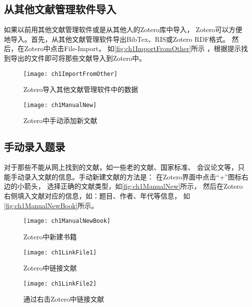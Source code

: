 \documentclass[cn,11pt,chinese]{elegantbook}
\begin{document}
	\subsection{从其他文献管理软件导入}\label{OtherRefSoft}
	如果以前用其他文献管理软件或是从其他人的Zotero库中导入，
	Zotero可以方便地导入。首先，从其他文献管理软件导出BibTex、RIS或Zotero RDF格式。
	然后，在Zotero中点击File-Import，
	如\autoref{fig:ch1ImportFromOther}所示
	，根据提示找到导出的文件即可将那些文献导入到Zotero中。
	\begin{figure}
		\centering
		\begin{minipage}[t]{\dimexpr0.5\textwidth-4em}
			\centering
			\texttt{[image: ch1ImportFromOther]}
			\caption{Zotero导入其他文献管理软件中的数据}
			\label{fig:ch1ImportFromOther}
		\end{minipage}	
		\hspace{1cm}
		\begin{minipage}[t]{\dimexpr0.5\textwidth-4em}
			\centering
			\texttt{[image: ch1ManualNew]}
			\caption{Zotero中手动添加新文献}
			\label{fig:ch1ManualNew}
		\end{minipage}	
	\end{figure}

	\subsection{手动录入题录}\label{sec:ManualImport}
	对于那些不能从网上找到的文献，如一些老的文献、国家标准、
	会议论文等，只能手动录入文献的信息。手动新建文献的方法是：
	在Zotero界面中点击“+”图标右边的小箭头，
	选择正确的文献类型，如\autoref{fig:ch1ManualNew}所示，
	然后在Zotero右侧填入文献对应的信息，如：题目、作者、年代等信息，
	如\autoref{fig:ch1ManualNewBook}所示。
			\begin{figure}
					\centering
					\begin{minipage}[t]{\dimexpr0.5\textwidth-4em}
					\centering
					\texttt{[image: ch1ManualNewBook]}
					\caption{Zotero中新建书籍}
					\label{fig:ch1ManualNewBook}
				\end{minipage}	
				\hspace{2cm}
				\begin{minipage}[t]{\dimexpr0.5\textwidth-4em}
					\centering
					\texttt{[image: ch1LinkFile1]}
					\caption{Zotero中链接文献}
					\label{fig:ch1LinkFile1}
				\end{minipage}	
			\end{figure}
			\begin{figure}
				\centering
				\texttt{[image: ch1LinkFile2]}
				\caption{通过右击Zotero中链接文献}
				\label{fig:ch1LinkFile2}
			\end{figure}
\end{document}
